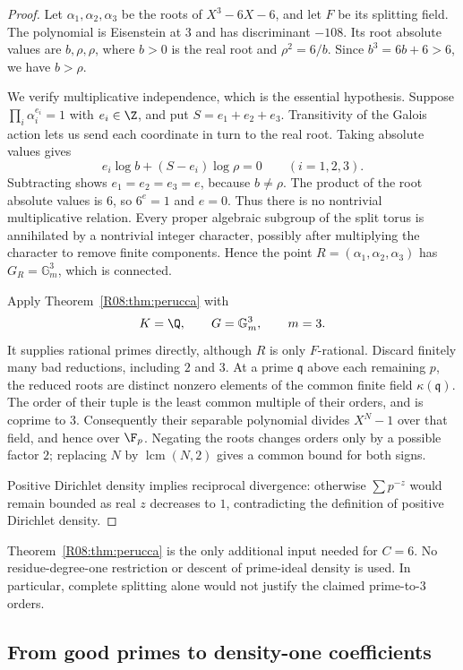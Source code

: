 \documentclass[11pt,a4paper]{article}
\theoremstyle{definition}\newtheorem{definition}[theorem]{Definition}
\theoremstyle{remark}\newtheorem{remark}[theorem]{Remark}
\DeclareMathOperator{\lcm}{lcm}\DeclareMathOperator{\disc}{disc}\DeclareMathOperator{\Res}{Res}
\begin{document}
\begin{proof}
Let $\alpha_1,\alpha_2,\alpha_3$ be the roots of $X^3-6X-6$,
and let $F$ be its splitting field. The polynomial is Eisenstein at $3$
and has discriminant $-108$. Its root absolute values are $b,\rho,\rho$,
where $b>0$ is the real root and $\rho^2=6/b$.
Since $b^3=6b+6>6$, we have $b>\rho$.

We verify multiplicative independence, which is the essential hypothesis.
Suppose $\prod_i\alpha_i^{e_i}=1$ with $e_i\in\Z$, and put
$S=e_1+e_2+e_3$. Transitivity of the Galois action lets us send each
coordinate in turn to the real root. Taking absolute values gives
\[
                 e_i\log b+(S-e_i)\log\rho=0\qquad(i=1,2,3).
\]
Subtracting shows $e_1=e_2=e_3=e$, because $b\ne\rho$.
The product of the root absolute values is $6$, so $6^e=1$ and $e=0$.
Thus there is no nontrivial multiplicative relation. Every proper
algebraic subgroup of the split torus is annihilated by a nontrivial
integer character, possibly after multiplying the character to remove
finite components. Hence the point $R=(\alpha_1,\alpha_2,\alpha_3)$
has $G_R=\mathbb G_m^3$, which is connected.

Apply Theorem~\ref{R08:thm:perucca} with
\[
                    K=\Q,\qquad G=\mathbb G_m^3,\qquad m=3.
\]
It supplies rational primes directly, although $R$ is only $F$-rational.
Discard finitely many bad reductions, including $2$ and $3$.
At a prime $\mathfrak q$ above each remaining $p$, the reduced roots
are distinct nonzero elements of the common finite field
$\kappa(\mathfrak q)$. The order of their tuple is the least common
multiple of their orders, and is coprime to $3$.
Consequently their separable polynomial divides $X^N-1$ over that
field, and hence over $\F_p$.
Negating the roots changes orders only by a possible factor $2$;
replacing $N$ by $\lcm(N,2)$ gives a common bound for both signs.

Positive Dirichlet density implies reciprocal divergence: otherwise
$\sum p^{-z}$ would remain bounded as real $z$ decreases to $1$,
contradicting the definition of positive Dirichlet density.
\end{proof}

Theorem~\ref{R08:thm:perucca} is the only additional input needed for $C=6$.
No residue-degree-one restriction or descent of prime-ideal density
is used. In particular, complete splitting alone would not justify
the claimed prime-to-$3$ orders.

\subsection{From good primes to density-one coefficients}
\end{document}
